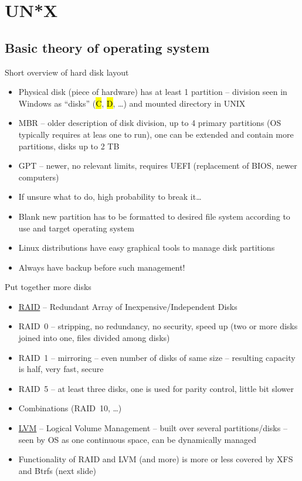 \documentclass[compress, ucs, xelatex, 11pt, xcolor=svgnames,
  hyperref={
    bookmarks=true,
    unicode=true,
    colorlinks=true,
    pdftitle={Linux, command line and MetaCentrum},
    plainpages=false,
    pdfauthor={Vojtech Zeisek},
    pdfsubject={Course about use of Linux command line, writing shell scripts and using MetaCentrum of CESNET},
    pdfcreator={XeLaTeX},
    pdfkeywords={Linux, GNU, BASH, shell, command line, MetaCentrum},
    linkcolor=Red,
    anchorcolor=Blue,
    citecolor=Purple,
    filecolor=DodgerBlue,
    menucolor=DarkOrchid,
    urlcolor=DeepSkyBlue,
    pdftex},
  url={hyphens, lowtilde} %
  ]{beamer}
\renewcommand{\texttt}[1]{\hl{\ttfamily #1}}
\begin{document}
\section{UN*X}

\subsection{Basic theory of operating system}

\begin{frame}{Short overview of hard disk layout}
\begin{itemize}
  \item Physical disk (piece of hardware) has at least 1 partition -- division seen in Windows as ``disks'' (\texttt{C}, \texttt{D}, \ldots) and mounted directory in UNIX
  \item MBR -- older description of disk division, up to 4 primary partitions (OS typically requires at leas one to run), one can be extended and contain more partitions, disks up to 2 TB
  \item GPT -- newer, no relevant limits, requires UEFI (replacement of BIOS, newer computers)
  \item If unsure what to do, high probability to break it\ldots
  \item Blank new partition has to be formatted to desired file system according to use and target operating system
  \item Linux distributions have easy graphical tools to manage disk partitions
  \item Always have backup before such management!
\end{itemize}
\end{frame}

\begin{frame}{Put together more disks}
\begin{itemize}
  \item \href{https://en.wikipedia.org/wiki/RAID}{RAID} -- Redundant Array of Inexpensive/Independent Disks
  \item RAID~0 -- stripping, no redundancy, no security, speed up (two or more disks joined into one, files divided among disks)
  \item RAID~1 -- mirroring -- even number of disks of same size -- resulting capacity is half, very fast, secure
  \item RAID~5 -- at least three disks, one is used for parity control, little bit slower
  \item Combinations (RAID~10, \ldots)
  \item \href{https://en.wikipedia.org/wiki/Logical_volume_management}{LVM} -- Logical Volume Management -- built over several partitions/disks -- seen by OS as one continuous space, can be dynamically managed
  \item Functionality of RAID and LVM (and more) is more or less covered by XFS and Btrfs (next slide)
\end{itemize}
\end{frame}
\end{document}
